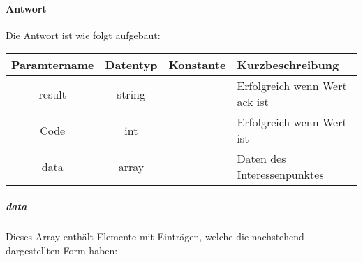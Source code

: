 \paragraph{Antwort}Die Antwort ist wie folgt aufgebaut:
\begin{table}[H]
	\begin{tabular}{|c|c|c|p{6.5cm}|}
		\hline
		\textbf{Paramtername} & \textbf{Datentyp} & \textbf{Konstante} & \textbf{Kurzbeschreibung}                                                                                               \\ \hline
		result              & string           &                 & Erfolgreich wenn Wert {\glqq ack\grqq} ist \\ \hline
		Code                & int              &                 & Erfolgreich wenn Wert {\glqq 0\grqq} ist \\ \hline
		data                & array            &                 & Daten des Interessenpunktes \\ \hline
	\end{tabular}
\end{table}
\subparagraph{data}Dieses Array enthält Elemente mit Einträgen, welche die nachstehend dargestellten Form haben:
